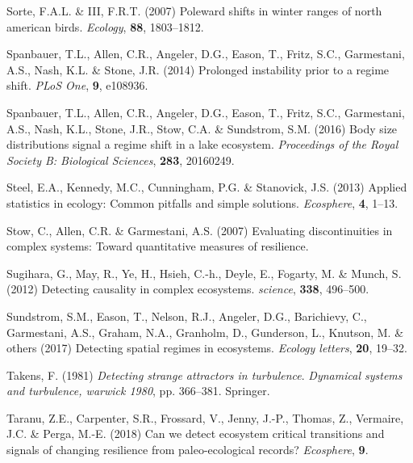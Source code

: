 \documentclass[12pt,twoside,openany]{reedthesis}
\begin{document}
\leavevmode\hypertarget{ref-sorte2007poleward}{}%
Sorte, F.A.L. \& III, F.R.T. (2007) Poleward shifts in winter ranges of north american birds. \emph{Ecology}, \textbf{88}, 1803--1812.

\leavevmode\hypertarget{ref-spanbauer_prolonged_2014}{}%
Spanbauer, T.L., Allen, C.R., Angeler, D.G., Eason, T., Fritz, S.C., Garmestani, A.S., Nash, K.L. \& Stone, J.R. (2014) Prolonged instability prior to a regime shift. \emph{PLoS One}, \textbf{9}, e108936.

\leavevmode\hypertarget{ref-spanbauer2016body}{}%
Spanbauer, T.L., Allen, C.R., Angeler, D.G., Eason, T., Fritz, S.C., Garmestani, A.S., Nash, K.L., Stone, J.R., Stow, C.A. \& Sundstrom, S.M. (2016) Body size distributions signal a regime shift in a lake ecosystem. \emph{Proceedings of the Royal Society B: Biological Sciences}, \textbf{283}, 20160249.

\leavevmode\hypertarget{ref-steel2013applied}{}%
Steel, E.A., Kennedy, M.C., Cunningham, P.G. \& Stanovick, J.S. (2013) Applied statistics in ecology: Common pitfalls and simple solutions. \emph{Ecosphere}, \textbf{4}, 1--13.

\leavevmode\hypertarget{ref-stow2007evaluating}{}%
Stow, C., Allen, C.R. \& Garmestani, A.S. (2007) Evaluating discontinuities in complex systems: Toward quantitative measures of resilience.

\leavevmode\hypertarget{ref-sugihara2012detecting}{}%
Sugihara, G., May, R., Ye, H., Hsieh, C.-h., Deyle, E., Fogarty, M. \& Munch, S. (2012) Detecting causality in complex ecosystems. \emph{science}, \textbf{338}, 496--500.

\leavevmode\hypertarget{ref-sundstrom2017detecting}{}%
Sundstrom, S.M., Eason, T., Nelson, R.J., Angeler, D.G., Barichievy, C., Garmestani, A.S., Graham, N.A., Granholm, D., Gunderson, L., Knutson, M. \& others (2017) Detecting spatial regimes in ecosystems. \emph{Ecology letters}, \textbf{20}, 19--32.

\leavevmode\hypertarget{ref-takens1981detecting}{}%
Takens, F. (1981) \emph{Detecting strange attractors in turbulence}. \emph{Dynamical systems and turbulence, warwick 1980}, pp. 366--381. Springer.

\leavevmode\hypertarget{ref-taranu2018can}{}%
Taranu, Z.E., Carpenter, S.R., Frossard, V., Jenny, J.-P., Thomas, Z., Vermaire, J.C. \& Perga, M.-E. (2018) Can we detect ecosystem critical transitions and signals of changing resilience from paleo-ecological records? \emph{Ecosphere}, \textbf{9}.
\end{document}
